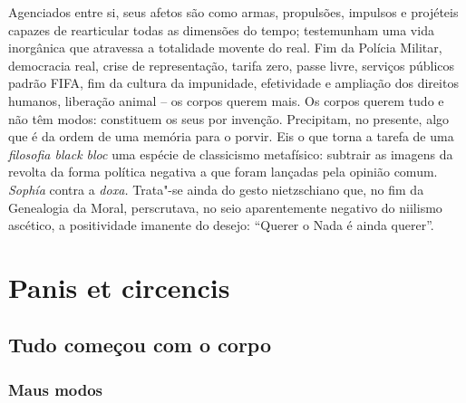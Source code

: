 Agenciados entre si, seus afetos são como armas, propulsões, impulsos e
projéteis capazes de rearticular todas as dimensões do tempo;
testemunham uma vida inorgânica que atravessa a totalidade movente do
real. Fim da Polícia Militar, democracia real, crise de representação,
tarifa zero, passe livre, serviços públicos padrão FIFA, fim da cultura
da impunidade, efetividade e ampliação dos direitos humanos, liberação
animal -- os corpos querem mais. Os corpos querem tudo e não têm modos:
constituem os seus por invenção. Precipitam, no presente, algo que é da
ordem de uma memória para o porvir. Eis o que torna a tarefa de uma
\emph{filosofia black bloc} uma espécie de classicismo metafísico:
subtrair as imagens da revolta da forma política negativa a que foram
lançadas pela opinião comum. \emph{Sophía} contra a \emph{doxa.}
Trata"-se ainda do gesto nietzschiano que, no fim da Genealogia da Moral,
perscrutava, no seio aparentemente negativo do niilismo ascético, a
positividade imanente do desejo: ``Querer o Nada é ainda querer''.

\chapter{Panis et circencis}


\section{Tudo começou com o corpo}

\subsection{Maus modos}

